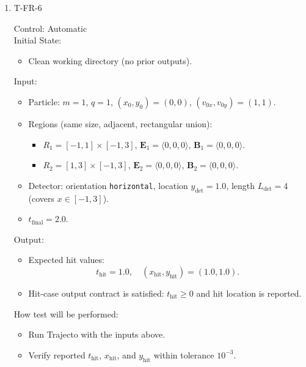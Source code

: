 \documentclass[12pt, titlepage]{article}
\begin{document}
\begin{enumerate}

\item{T-FR-6\\}

Control: Automatic\\

Initial State:
\begin{itemize}
  \item Clean working directory (no prior outputs).
\end{itemize}

Input:
\begin{itemize}
  \item Particle: $m=1$, $q=1$, $(x_0,y_0)=(0,0)$, $(v_{0x},v_{0y})=(1,1)$.
  \item Regions (same size, adjacent, rectangular union):
  \begin{itemize}
    \item $R_1=[-1,1]\times[-1,3]$,
    $\mathbf{E}_1=\langle 0,0,0\rangle$, $\mathbf{B}_1=\langle 0,0,0\rangle$.
    \item $R_2=[1,3]\times[-1,3]$,
    $\mathbf{E}_2=\langle 0,0,0\rangle$, $\mathbf{B}_2=\langle 0,0,0\rangle$.
  \end{itemize}
  \item Detector: orientation \texttt{horizontal}, location
  $y_{\mathrm{det}}=1.0$, length $L_{\mathrm{det}}=4$ (covers $x\in[-1,3]$).
  \item $t_{\text{final}}=2.0$.
\end{itemize}

Output:
\begin{itemize}
  \item Expected hit values:
  \[
    t_{\mathrm{hit}} = 1.0,\quad (x_{\mathrm{hit}},y_{\mathrm{hit}})=(1.0,1.0).
  \]
  \item Hit-case output contract is satisfied:
  $t_{\mathrm{hit}}\ge 0$ and hit location is reported.
\end{itemize}

How test will be performed:
\begin{itemize}
  \item Run Trajecto with the inputs above.
  \item Verify reported $t_{\mathrm{hit}}$, $x_{\mathrm{hit}}$,
  and $y_{\mathrm{hit}}$ within tolerance $10^{-3}$.
\end{itemize}

\end{enumerate}
\end{document}
